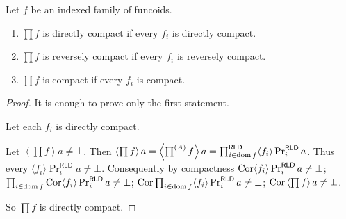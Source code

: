 \begin{thm}
Let $f$ be an indexed family of funcoids. 

\begin{enumerate}
  \item $\prod f$ is directly compact if every $f_i$ is directly compact.
  
  \item $\prod f$ is reversely compact if every $f_i$ is reversely compact.
  
  \item $\prod f$ is compact if every $f_i$ is compact.
\end{enumerate}
\end{thm}

\begin{proof}
  It is enough to prove only the first statement.
  
  Let each $f_i$ is directly compact.
  
  Let $\left\langle \prod f \right\rangle a \neq \bot$. Then $\left\langle \prod
  f \right\rangle a = \left\langle \prod^{(A)} f \right\rangle a =
  \prod^{\mathsf{RLD}}_{i \in \operatorname{dom} f} \langle f_i \rangle
  \Pr^{\mathsf{RLD}}_i a$. Thus every $\langle f_i \rangle
  \Pr^{\mathsf{RLD}}_i a \neq \bot$. Consequently by compactness
  $\operatorname{Cor} \langle f_i \rangle \Pr^{\mathsf{RLD}}_i a \neq \bot$;
  $\prod_{i \in \operatorname{dom} f} \operatorname{Cor} \langle f_i \rangle
  \Pr^{\mathsf{RLD}}_i a \neq \bot$; $\operatorname{Cor} \prod_{i \in \operatorname{dom}
  f} \langle f_i \rangle \Pr^{\mathsf{RLD}}_i a \neq \bot$; $\operatorname{Cor}
  \left\langle \prod f \right\rangle a \neq \bot$.
  
  So $\prod f$ is directly compact.
\end{proof}

